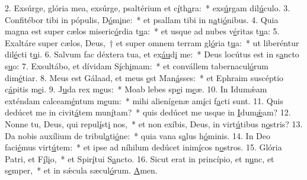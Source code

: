 2. Exsúrge, glória mea, exsúrge, psaltérium et c\uline{í}th\uline{a}ra:~* exs\uline{ú}rgam dil\uline{ú}culo.
3. Confitébor tibi in pópulis, D\uline{ó}m\uline{i}ne:~* et psallam tibi in n\uline{a}ti\uline{ó}nibus.
4. Quia magna est super cælos miseric\uline{ó}rdia t\uline{u}a:~* et usque ad nubes v\uline{é}ritas t\uline{u}a:
5. Exaltáre super cælos, Deus,~† et super omnem terram gl\uline{ó}ria t\uline{u}a:~* ut liberéntur dil\uline{é}cti t\uline{u}i.
6. Salvum fac déxtera tua, et ex\uline{áu}d\uline{i} me:~* Deus locútus est in s\uline{a}ncto s\uline{u}o:
7. Exsultábo, et dívidam S\uline{í}ch\uline{i}mam:~* et convállem tabernacul\uline{ó}rum dim\uline{é}tiar.
8. Meus est Gálaad, et meus \uline{e}st Man\uline{á}sses:~* et Ephraim suscéptio c\uline{á}pitis m\uline{e}i.
9. J\uline{u}da rex m\uline{e}us:~* Moab lebes sp\uline{e}i m\uline{e}æ.
10. In Idumǽam exténdam calceam\uline{é}ntum m\uline{e}um:~* mihi alienígenæ am\uline{í}ci f\uline{a}cti sunt.
11. Quis dedúcet me in civit\uline{á}tem mun\uline{í}tam?~* quis dedúcet me usque in \uline{I}dum\uline{ǽ}am?
12. Nonne tu, Deus, qui repul\uline{í}st\uline{i} nos,~* et non exíbis, Deus, in virt\uline{ú}tibus n\uline{o}stris?
13. Da nobis auxílium de tribul\uline{a}ti\uline{ó}ne:~* quia vana s\uline{a}lus h\uline{ó}minis.
14. In Deo faci\uline{é}mus virt\uline{ú}tem:~* et ipse ad níhilum dedúcet inim\uline{í}cos n\uline{o}stros.
15. Glória Patri, et F\uline{í}l\uline{i}o,~* et Spir\uline{í}tui S\uline{a}ncto.
16. Sicut erat in princípio, et n\uline{u}nc, et s\uline{e}mper,~* et in sǽcula sæcul\uline{ó}rum. \uline{A}men.
